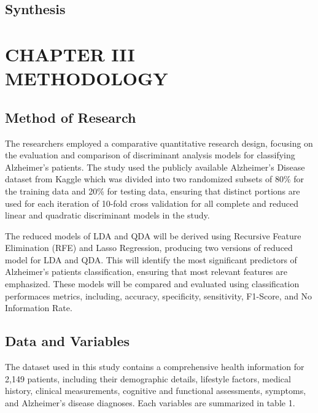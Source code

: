 \documentclass[12pt]{article}
\begin{document}
\subsection{Synthesis}

\newpage
\section{CHAPTER III \\ METHODOLOGY}

\subsection{Method of Research}
\noindent

The researchers employed a comparative quantitative research design, focusing on the evaluation and comparison of discriminant analysis models for classifying Alzheimer's patients. 
The study used the publicly available Alzheimer's Disease dataset from Kaggle which was divided into two randomized subsets of 80\% for the training data and 20\% for testing data, ensuring that distinct
portions are used for each iteration of 10-fold cross validation for all complete and reduced linear and quadratic discriminant models in the study. 

The reduced models of LDA and QDA will be derived using Recursive Feature Elimination (RFE) and Lasso Regression, producing two versions of reduced model for LDA and QDA. This will identify the most significant 
predictors of Alzheimer's patients classification, ensuring that most relevant features are emphasized. These models will be compared and evaluated using classification performaces metrics, including, accuracy, specificity, 
sensitivity, F1-Score, and No Information Rate. 

\subsection{Data and Variables}
\noindent

The dataset used in this study contains a comprehensive health information for 2,149 patients, including their demographic details, lifestyle factors, medical history, clinical measurements, cognitive and functional assessments, symptoms, 
and Alzheimer's disease diagnoses. Each variables are summarized in table 1. \\
\end{document}
